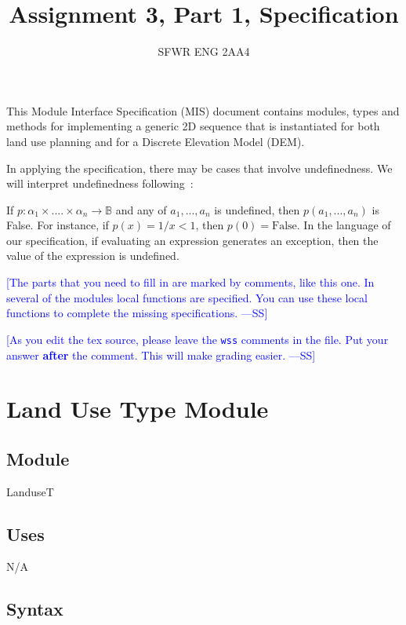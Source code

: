 \documentclass[12pt]{article}
\title{Assignment 3, Part 1, Specification}
\author{SFWR ENG 2AA4}
\newcommand{\authornote}[3]{\textcolor{#1}{[#3 ---#2]}}
\newcommand{\authornote}[3]{}
\newcommand{\wss}[1]{\authornote{blue}{SS}{#1}}
\begin{document}
\maketitle
This Module Interface Specification (MIS) document contains modules, types and
methods for implementing a generic 2D sequence that is instantiated for both
land use planning and for a Discrete Elevation Model (DEM).

In applying the specification, there may be cases that involve undefinedness.
We will interpret undefinedness following~\cite{Farmer2004}:

If $p: \alpha_1 \times .... \times \alpha_n \rightarrow \mathbb{B}$ and any of
$a_1, ..., a_n$ is undefined, then $p(a_1, ..., a_n)$ is False.  For instance,
if $p(x) = 1/x < 1$, then $p(0) = \text{False}$.  In the language of our
specification, if evaluating an expression generates an exception, then the
value of the expression is undefined.

\wss{The parts that you need to fill in are marked by comments, like this one.
  In several of the modules local functions are specified.  You can use these
  local functions to complete the missing specifications.}

\wss{As you edit the tex source, please leave the \texttt{wss} comments in the
  file.  Put your answer \textbf{after} the comment.  This will make grading
  easier.}




\newpage

\section* {Land Use Type Module}

\subsection*{Module}

LanduseT

\subsection* {Uses}

N/A

\subsection* {Syntax}
\end{document}
